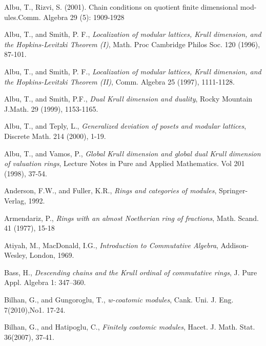 \begin{thebibliography}{47}
\latin
\LTRbibitems

Albu, T., Rizvi, S. (2001). Chain conditions on quotient finite dimensional mod-
ules.Comm. Algebra 29 (5): 1909-1928

Albu, T., and Smith, P. F., {\it Localization of modular lattices, Krull dimension, and the Hopkins-Levitzki Theorem (I)},
Math. Proc Cambridge Philos Soc. 120 (1996), 87-101.

Albu, T., and Smith, P. F., {\it Localization of modular lattices, Krull dimension, and the Hopkins-Levitzki Theorem (II)}, Comm. Algebra 25 (1997), 1111-1128.

Albu, T., and Smith, P.F., {\it Dual Krull dimension and duality}, Rocky Mountain J.Math. 29 (1999), 1153-1165.

Albu, T., and Teply, L., {\it Generalized deviation of posets and modular lattices}, Discrete Math. 214 (2000), 1-19.

Albu, T., and Vamos, P., {\it Global Krull dimension and global dual Krull dimension of valuation rings}, Lecture Notes in Pure and Applied Mathematics. Vol 201 (1998), 37-54.


Anderson, F.W., and Fuller, K.R., {\it Rings and categories of modules}, Springer-Verlag, 1992.

Armendariz, P., {\it Rings with an almost Noetherian ring of fractions}, Math. Scand. 41 (1977), 15-18

Atiyah, M., MacDonald, I.G., {\it Introduction to Commutative Algebra}, Addison-Wesley, London, 1969.


Bass, H., {\it Descending chains and the Krull ordinal of commutative rings}, J.
Pure Appl. Algebra 1: 347--360.


Bilhan, G., and Gungoroglu, T., {\it w-coatomic modules}, Cank. Uni. J. Eng. 7(2010),No1. 17-24.

Bilhan, G., and Hatipoglu, C., {\it Finitely coatomic modules}, Hacet. J. Math. Stat. 36(2007), 37-41. 


\end{thebibliography}
